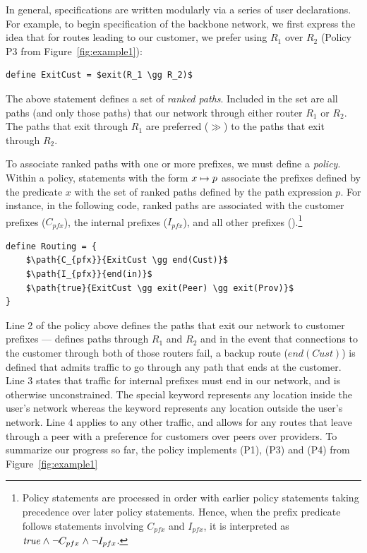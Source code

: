 In general, \sysname specifications are written modularly via a series
of user declarations.  
For example, to begin specification of the backbone
network, we first express the idea that for routes leading to our customer,
we prefer using $R_1$ over $R_2$ (Policy P3 from Figure~\ref{fig:example1}):
\begin{lstlisting}[mathescape=true]
define ExitCust = $exit(R_1 \gg R_2)$
\end{lstlisting}
The above statement defines a set of \emph{ranked paths}.
Included in the set are all paths (and only those paths) that  
our network
through either router $R_1$ or $R_2$.  The paths that exit through $R_1$
are preferred ($\gg$) to the paths that exit through $R_2$. 

To associate ranked paths with
one or more prefixes, we must define a \sysname \emph{policy}.  
Within a policy, statements with the form $x \mapsto p$
associate the prefixes defined by the predicate $x$ with the set of 
ranked paths defined by the path expression $p$.
For instance, in the following code, ranked paths are associated with
the customer prefixes ($C_{pfx}$), the internal prefixes ($I_{pfx}$),
and all other prefixes ().\footnote{Policy statements are processed in
order with earlier policy statements taking precedence over later
policy statements.  Hence, when the prefix predicate  follows
statements involving $C_{pfx}$ and $I_{pfx}$, it is interpreted as
$\textit{true} \mathrel{\wedge} \neg C_{pfx} \mathrel{\wedge} \neg I_{pfx}$.}

\begin{lstlisting}[mathescape=true]
define Routing = {
    $\path{C_{pfx}}{ExitCust \gg end(Cust)}$
    $\path{I_{pfx}}{end(in)}$
    $\path{true}{ExitCust \gg exit(Peer) \gg exit(Prov)}$
}
\end{lstlisting}

Line 2 of the policy above
defines the paths that exit our network to customer prefixes ---
 defines paths through $R_1$ and $R_2$ and in the event
that connections to the customer through both of those routers fail,
a backup route ($end(Cust)$) is defined that admits traffic to go through
any path that ends at the customer.  
Line 3 states that traffic for internal prefixes must end in our network, and is otherwise unconstrained.  The special keyword  represents any location
inside the user's network whereas the keyword  represents any location
outside the user's network.
Line 4 applies to any other traffic, and allows for any routes that leave through a peer with a preference for customers over peers over providers. To summarize our progress so far, the  policy 
implements (P1), (P3) and (P4) from Figure~\ref{fig:example1}

